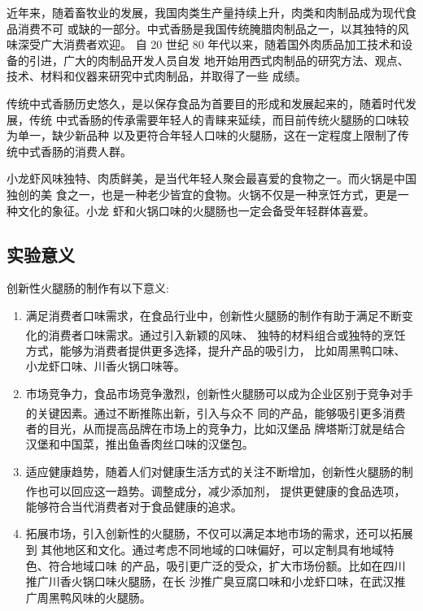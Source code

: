 \documentclass[UTF8]{ctexart}
\begin{document}
	近年来，随着畜牧业的发展，我国肉类生产量持续上升，肉类和肉制品成为现代食品消费不可
	或缺的一部分。中式香肠是我国传统腌腊肉制品之一，以其独特的风味深受广大消费者欢迎。
	自 20 世纪 80 年代以来，随着国外肉质品加工技术和设备的引进，广大的肉制品开发人员自发
	地开始用西式肉制品的研究方法、观点、技术、材料和仪器来研究中式肉制品，并取得了一些
	成绩。

	传统中式香肠历史悠久，是以保存食品为首要目的形成和发展起来的，随着时代发展，传统
	中式香肠的传承需要年轻人的青睐来延续，而目前传统火腿肠的口味较为单一，缺少新品种
	以及更符合年轻人口味的火腿肠，这在一定程度上限制了传统中式香肠的消费人群。

	小龙虾风味独特、肉质鲜美，是当代年轻人聚会最喜爱的食物之一。而火锅是中国独创的美
	食之一，也是一种老少皆宜的食物。火锅不仅是一种烹饪方式，更是一种文化的象征。小龙
	虾和火锅口味的火腿肠也一定会备受年轻群体喜爱。

	\subsection{实验意义}

	创新性火腿肠的制作有以下意义:
	\begin{enumerate}
		\item 满足消费者口味需求，在食品行业中，创新性火腿肠的制作有助于满足不断变
		化的消费者口味需求\textsuperscript{\cite{ref1}}。通过引入新颖的风味、
		独特的材料组合或独特的烹饪方式，能够为消费者提供更多选择，提升产品的吸引力，
		比如周黑鸭口味、小龙虾口味、川香火锅口味等。

		\item 市场竞争力，食品市场竞争激烈，创新性火腿肠可以成为企业区别于竞争对手
		的关键因素\textsuperscript{\cite{ref2}}。通过不断推陈出新，引入与众不
		同的产品，能够吸引更多消费者的目光，从而提高品牌在市场上的竞争力，比如汉堡品
		牌塔斯汀就是结合汉堡和中国菜，推出鱼香肉丝口味的汉堡包。

		\item 适应健康趋势，随着人们对健康生活方式的关注不断增加，创新性火腿肠的制
		作也可以回应这一趋势\textsuperscript{\cite{ref3}}。调整成分，减少添加剂，
		提供更健康的食品选项，能够符合当代消费者对于食品健康的追求。
		
		\item 拓展市场，引入创新性的火腿肠，不仅可以满足本地市场的需求，还可以拓展到
		其他地区和文化。通过考虑不同地域的口味偏好，可以定制具有地域特色、符合地域口味
		的产品，吸引更广泛的受众，扩大市场份额。比如在四川推广川香火锅口味火腿肠，在长
		沙推广臭豆腐口味和小龙虾口味，在武汉推广周黑鸭风味的火腿肠。
	\end{enumerate}
\end{document}
